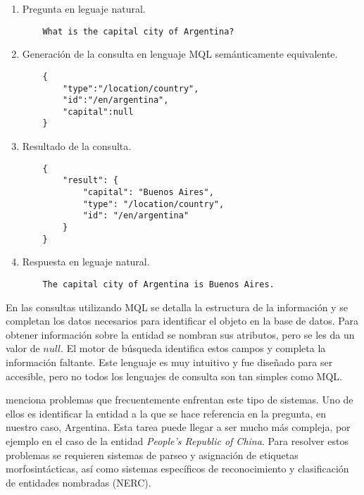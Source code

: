 \begin{example}\label{QALD-etapas}\hfill
    \begin{enumerate}
        \item Pregunta en leguaje natural.
            \begin{lstlisting}
    What is the capital city of Argentina?
            \end{lstlisting}
        \item Generación de la consulta en lenguaje MQL semánticamente equivalente.
            \begin{lstlisting}
    {
        "type":"/location/country",
        "id":"/en/argentina",
        "capital":null
    }
            \end{lstlisting}
        \item Resultado de la consulta.
            \begin{lstlisting}
    {
        "result": {
            "capital": "Buenos Aires",
            "type": "/location/country",
            "id": "/en/argentina"
        }
    }
            \end{lstlisting}
        \item Respuesta en leguaje natural.
            \begin{lstlisting}
    The capital city of Argentina is Buenos Aires.
            \end{lstlisting}
    \end{enumerate}
\end{example}

En las consultas utilizando MQL se detalla la estructura de la información y se completan los datos necesarios para identificar el objeto en la base de datos. Para obtener información sobre la entidad se nombran sus atributos, pero se les da un valor de $null$. El motor de búsqueda identifica estos campos y completa la información faltante. Este lenguaje es muy intuitivo y fue diseñado para ser accesible, pero no todos los lenguajes de consulta son tan simples como MQL.

\citet{ungerQALD} menciona problemas que frecuentemente enfrentan este tipo de sistemas. Uno de ellos es identificar la entidad a la que se hace referencia en la pregunta, en nuestro caso, Argentina. Esta tarea puede llegar a ser mucho más compleja, por ejemplo en el caso de la entidad \textit{People's Republic of China}. Para resolver estos problemas se requieren sistemas de parseo y asignación de etiquetas morfosintácticas, así como sistemas específicos de reconocimiento y clasificación de entidades nombradas (NERC).

